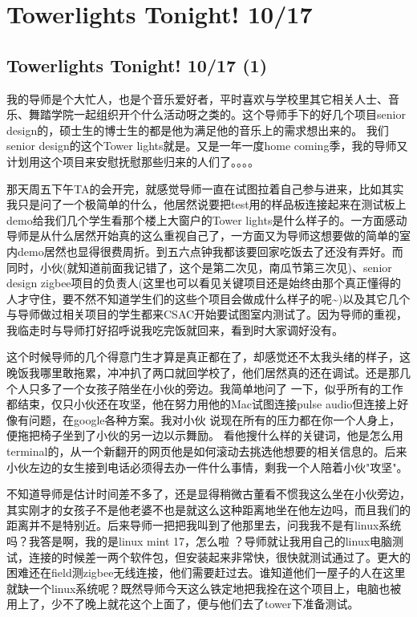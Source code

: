 \documentclass[12pt]{book}
\begin{document}
\chapter{Towerlights Tonight! 10/17}
\label{sec-16}
\section{Towerlights Tonight! 10/17 (1)}
\label{sec-16-1}
我的导师是个大忙人，也是个音乐爱好者，平时喜欢与学校里其它相关人士、音乐、舞踏学院一起组织开个什么活动呀之类的。这个导师手下的好几个项目senior design的，硕士生的博士生的都是他为满足他的音乐上的需求想出来的。 我们senior design的这个Tower lights就是。又是一年一度home coming季，我的导师又计划用这个项目来安慰抚慰那些归来的人们了。。。。

那天周五下午TA的会开完，就感觉导师一直在试图拉着自己参与进来，比如其实我只是问了一个极简单的什么，他居然说要把test用的样品板连接起来在测试板上demo给我们几个学生看那个楼上大窗户的Tower lights是什么样子的。一方面感动导师是从什么居然开始真的这么重视自己了，一方面又为导师这想要做的简单的室内demo居然也显得很费周折。到五六点钟我都该要回家吃饭去了还没有弄好。而同时，小伙(就知道前面我记错了，这个是第二次见，南瓜节第三次见)、senior design zigbee项目的负责人(这里也可以看见关键项目还是始终由那个真正懂得的人才守住，要不然不知道学生们的这些个项目会做成什么样子的呢\textasciitilde{})以及其它几个与导师做过相关项目的学生都来CSAC开始要试图室内测试了。因为导师的重视，我临走时与导师打好招呼说我吃完饭就回来，看到时大家调好没有。 

这个时候导师的几个得意门生才算是真正都在了，却感觉还不太我头绪的样子，这晚饭我哪里敢拖累，冲冲扒了两口就回学校了，他们居然真的还在调试。还是那几个人只多了一个女孩子陪坐在小伙的旁边。我简单地问了 一下，似乎所有的工作都结束，仅只小伙还在攻坚，他在努力用他的Mac试图连接pulse audio但连接上好像有问题，在google各种方案。我对小伙 说现在所有的压力都在你一个人身上，便拖把椅子坐到了小伙的另一边以示舞励。 看他搜什么样的关键词，他是怎么用terminal的，从一个新翻开的网页他是如何滚动去挑选他想要的相关信息的。后来小伙左边的女生接到电话必须得去办一件什么事情，剩我一个人陪着小伙"攻坚"。

不知道导师是估计时间差不多了，还是显得稍微古董看不惯我这么坐在小伙旁边，其实刚才的女孩子不是他老婆不也是就这么这种距离地坐在他左边吗，而且我们的距离并不是特别近。后来导师一把把我叫到了他那里去，问我我不是有linux系统吗？我答是啊，我的是linux mint 17，怎么啦 ？导师就让我用自己的linux电脑测试，连接的时候差一两个软件包，但安装起来非常快，很快就测试通过了。更大的困难还在field测zigbee无线连接，他们需要赶过去。谁知道他们一屋子的人在这里就缺一个linux系统呢？既然导师今天这么铁定地把我拴在这个项目上，电脑也被用上了，少不了晚上就花这个上面了，便与他们去了tower下准备测试。 
\end{document}
